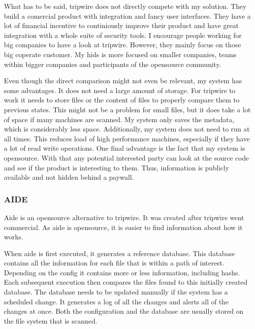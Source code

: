 What has to be said, tripwire does not directly compete with my solution. They build a comercial product with integration and fancy user interfaces. They have a lot of financial incentive to continiously improve their product and have great integration with a whole suite of security tools. I encourage people working for big companies to have a look at tripwire. However, they mainly focus on those big coperate customer. My \gls{hids} is more focused on smaller companies, teams within bigger companies and participants of the \gls{opensource} community. 

Even though the direct comparison might not even be relevant, my system has some advantages. It does not need a large amount of storage. For tripwire to work it needs to store files or the content of files to properly compare them to previous states. This might not be a problem for small files, but it does take a lot of space if many machines are scanned. My system only saves the \gls{metadata}, which is considerably less space. Additionally, my system does not need to run at all times. This reduces load of high performance machines, especially if they have a lot of read write operations. One final advantage is the fact that my system is \gls{opensource}. With that any potential interested party can look at the source code and see if the product is interesting to them. Thus, information is publicly available and not hidden behind a paywall.

\subsubsection{AIDE}
\label{sec:aide}

Aide is an \gls{opensource} alternative to tripwire. It was created after tripwire went commercial. As aide is \gls{opensource}, it is easier to find information about how it works. \cite{aide:totherescue, aide:github}

When aide is first executed, it generates a reference database. This database contains all the information for each file that is within a path of interest. Depending on the config it contains more or less information, including \glspl{hash}. Each subsequent execution then compares the files found to this initially created database. The database needs to be updated manually if the system has a scheduled change. It generates a log of all the changes and alerts all of the changes at once. Both the configuration and the database are usually stored on the file system that is scanned. \cite{aide, aide:doc}

